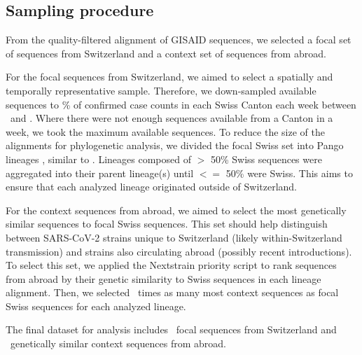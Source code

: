 \documentclass[9pt,twoside,lineno]{pnas-new} %
\newcommand{\maxsamplingpercent}{\maxsamplingfraction*100}
\begin{document}
\subsection*{Sampling procedure}

From the quality-filtered alignment of GISAID sequences, we selected a focal set of sequences from Switzerland and a context set of sequences from abroad. 

For the focal sequences from Switzerland, we aimed to select a spatially and temporally representative sample. Therefore, we down-sampled available sequences to \fpeval{\maxsamplingpercent}\% of confirmed case counts in each Swiss Canton each week between \mindate\ and \maxdate. Where there were not enough sequences available from a Canton in a week, we took the maximum available sequences. To reduce the size of the alignments for phylogenetic analysis, we divided the focal Swiss set into Pango lineages \cite{Rambaut}, similar to \cite{DuPlessis2021}. Lineages composed of $>$ 50\% Swiss sequences were aggregated into their parent lineage(s) until $<=$ 50\% were Swiss. This aims to ensure that each analyzed lineage originated outside of Switzerland.

For the context sequences from abroad, we aimed to select the most genetically similar sequences to focal Swiss sequences. This set should help distinguish between SARS-CoV-2 strains unique to Switzerland (likely within-Switzerland transmission) and strains also circulating abroad (possibly recent introductions). To select this set, we applied the Nextstrain priority script \cite{Nextstrain} to rank sequences from abroad by their genetic similarity to Swiss sequences in each lineage alignment. Then, we selected \similaritycontextscalefactor\ times as many most context sequences as focal Swiss sequences for each analyzed lineage. 

The final dataset for analysis includes \nfocalsamples\ focal sequences from Switzerland and \nsimcontext\ genetically similar context sequences from abroad.
\end{document}
